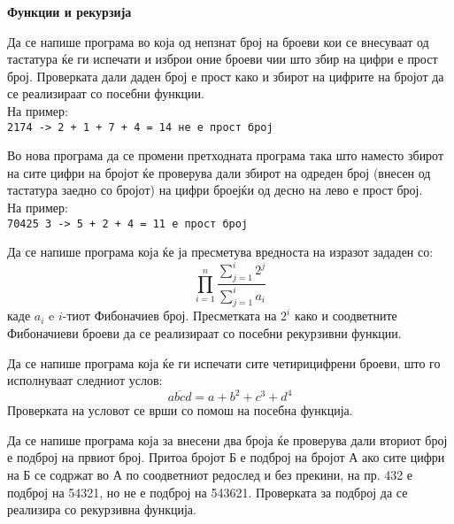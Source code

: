 \documentclass[12pt,a4paper]{exam}
\begin{document}
\pagestyle{headandfoot}
\headrule
{}
\begin{center}
\Large{\textbf{Функции и рекурзија}}
\end{center}
\begin{questions}

\question
Да се напише програма во која од непзнат број на броеви кои се внесуваат од
тастатура ќе ги испечати и изброи оние броеви чии што збир на цифри е
прост број. Проверката дали даден број е прост како и збирот на цифрите на
бројот да се реализираат со посебни функции.
\\На пример:\\
\texttt{2174 -> 2 + 1 + 7 + 4 = 14 не е прост број}

\question
Во нова програма да се промени претходната програма така што наместо збирот
на сите цифри на бројот ќе проверува дали збирот на одреден број (внесен од
тастатура заедно со бројот) на цифри броејќи од десно на лево е
прост број.
\\На пример:\\
\texttt{70425 3 -> 5 + 2 + 4 = 11 е прост број}

\question
Да се напише програма која ќе ја пресметува вредноста на изразот зададен со:
\[
    \prod_{i = 1}^{n}\frac{\sum_{j = 1}^{i} 2^j}{\sum_{j = 1}^{i} a_i}
\]
каде $a_i$ e $i$-тиот Фибоначиев број.  
Пресметката на $2^i$ како и соодветните Фибоначиеви броеви да
се реализираат со посебни рекурзивни функции.

\question
Да се напише програма која ќе ги испечати сите четирицифрени броеви,
што го исполнуваат следниот услов:
\[
    \overline{abcd} = a + b^2 + c^3 + d^4
\]
Проверката на условот се врши со помош на посебна функција.

\question
Да се напише програма која за внесени два броја ќе проверува дали вториот број е подброј на првиот број.
Притоа бројот Б е подброј на бројот А ако сите цифри на Б се содржат во А по соодветниот редослед и без прекини, 
на пр. 432 е подброј на 54321, но не е подброј на 543621. 
Проверката за подброј да се реализира со рекурзивна функција.



\end{questions}
\end{document}
